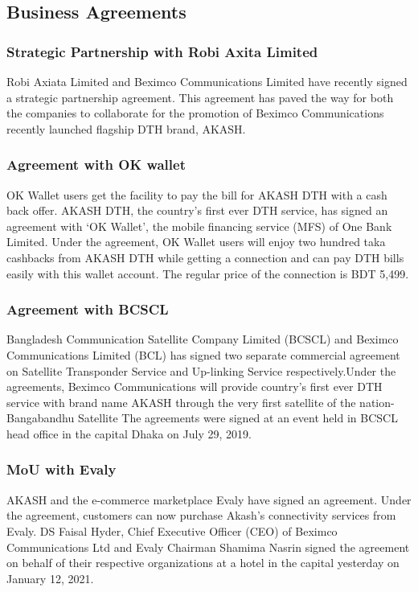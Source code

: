 \begin{spacing}{1.0}
\subsection{Business Agreements}
\subsubsection{Strategic Partnership with Robi Axita Limited}
Robi Axiata Limited and Beximco Communications Limited have recently signed a strategic partnership agreement. This agreement has paved the way for both the companies to collaborate for the promotion of Beximco Communications recently launched flagship DTH brand, AKASH.
\subsubsection{Agreement with OK wallet}
OK Wallet users get the facility to pay the bill for AKASH DTH with a cash back offer. AKASH DTH, the country's first ever DTH service, has signed an agreement with ‘OK Wallet’, the mobile financing service (MFS) of One Bank Limited. Under the agreement, OK Wallet users will enjoy two hundred taka cashbacks from AKASH DTH while getting a connection and can pay DTH bills easily with this wallet account. The regular price of the connection is BDT 5,499.
\subsubsection{Agreement with BCSCL}
Bangladesh Communication Satellite Company Limited (BCSCL) and Beximco Communications Limited (BCL) has signed two separate commercial agreement on Satellite Transponder Service and Up-linking Service respectively.Under the agreements, Beximco Communications will provide country’s first ever DTH service with brand name AKASH through the very first satellite of the nation- Bangabandhu Satellite The agreements were signed at an event held in BCSCL head office in the capital Dhaka on July 29, 2019.
\subsubsection{MoU with Evaly}
AKASH and the e-commerce marketplace Evaly have signed an agreement. Under the agreement, customers can now purchase Akash's connectivity services from Evaly. DS Faisal Hyder, Chief Executive Officer (CEO) of Beximco Communications Ltd and Evaly Chairman Shamima Nasrin signed the agreement on behalf of their respective organizations at a hotel in the capital yesterday on January 12, 2021.

\end{spacing}
